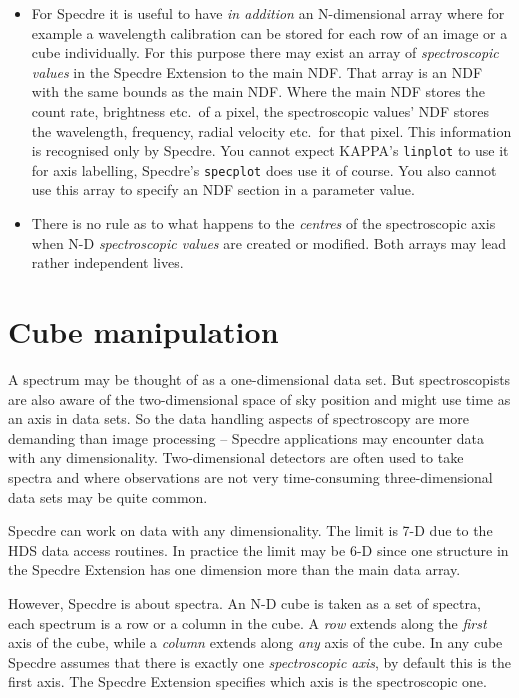\begin{itemize}
\item For Specdre it is useful to have {\it in addition} an
   N-dimensional array where for example a wavelength calibration can be
   stored for each row of an image or a cube individually.  For this
   purpose there may exist an array of {\it spectroscopic values} in the
   Specdre Extension to the main NDF.  That array is an NDF with the
   same bounds as the main NDF.  Where the main NDF stores the count
   rate, brightness etc.\ of a pixel, the spectroscopic values' NDF
   stores the wavelength, frequency, radial velocity etc.\ for that
   pixel.  This information is recognised only by Specdre.  You cannot
   expect KAPPA's {\tt linplot} to use it for axis labelling, Specdre's
   {\tt specplot} does use it of course.  You also cannot use this array
   to specify an NDF section in a parameter value.

\item There is no rule as to what happens to the {\it centres} of the
   spectroscopic axis when N-D {\it spectroscopic values} are created or
   modified.  Both arrays may lead rather independent lives.
\end{itemize}


\section{\label{cubeman}Cube manipulation}

   A spectrum may be thought of as a one-dimensional data set.  But
   spectroscopists are also aware of the two-dimensional space of sky
   position and might use time as an axis in data sets.  So the data
   handling aspects of spectroscopy are more demanding than image
   processing -- Specdre applications may encounter data with any
   dimensionality.  Two-dimensional detectors are often used to take
   spectra and where observations are not very time-consuming
   three-dimensional data sets may be quite common.

   Specdre can work on data with any dimensionality.  The limit is 7-D
   due to the HDS data access routines.  In practice the limit may be
   6-D since one structure in the Specdre Extension has one dimension
   more than the main data array.

   However, Specdre is about spectra.  An N-D cube is taken as a set of
   spectra, each spectrum is a row or a column in the cube.  A {\it row}
   extends along the {\it first} axis of the cube, while a {\it column}
   extends along {\it any} axis of the cube.  In any cube Specdre
   assumes that there is exactly one {\it spectroscopic axis}, by
   default this is the first axis.  The Specdre Extension specifies
   which axis is the spectroscopic one.

